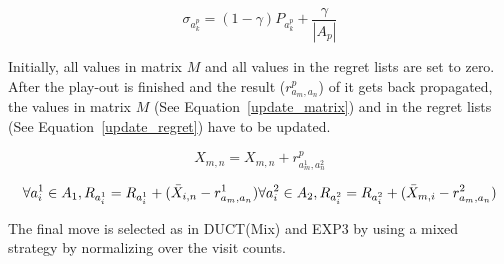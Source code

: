 \documentclass{article}
\begin{document}
\begin{equation}\label{regret_eq}
\sigma_{a^{p}_{k}}=(1-\gamma) P_{a^{p}_{k}} + \frac{\gamma}{|A_{p}|}
\end{equation}

Initially, all values in matrix $M$ and all values in the regret lists are set to zero. After the play-out is finished and the result ($r^{p}_{a_{m},a_{n}}$) of it gets back propagated, the values in matrix $M$ (See Equation~\ref{update_matrix}) and in the regret lists (See Equation~\ref{update_regret}) have to be updated.

\begin{equation}\label{update_matrix}
X_{m,n} = X_{m,n} + r^{p}_{a^{1}_{m},a^{2}_{n}}
\end{equation}

\begin{equation}\label{update_regret}
\forall a^{1}_{i} \in A_{1}, R_{a^{1}_{i}} = R_{a^{1}_{i}} + (\bar{X}_{i,n} - r^{1}_{a_{m},a_{n}})\\
\forall a^{2}_{i} \in A_{2}, R_{a^{2}_{i}} = R_{a^{2}_{i}} + (\bar{X}_{m,i} - r^{2}_{a_{m},a_{n}})
\end{equation}

The final move is selected as in DUCT(Mix) and EXP3 by using a mixed strategy by normalizing over the visit counts. 
\end{document}
